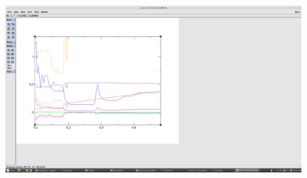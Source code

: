 \begin{enumerate}[label=\textbf{\arabic*})]
\begin{figure}[h!]
      \caption{}
      \label{fig2}
      \end{figure}
      \begin{figure}[h!] 
      \centering 
      \includegraphics[width=1.0\textwidth]{Figures/result1c.png} 
      \caption{}
      \label{fig3}
      \end{figure}


\end{enumerate}
